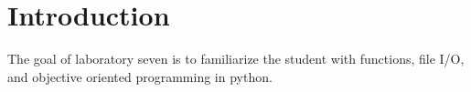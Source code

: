\section{Introduction}\label{sec: Introduction}
The goal of laboratory seven is to familiarize the student with functions, file I/O, and objective oriented programming in python.